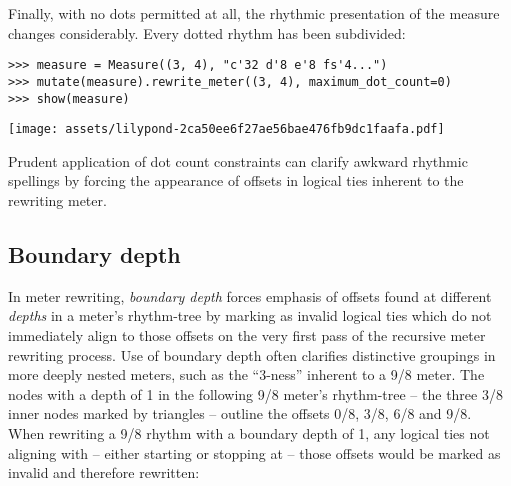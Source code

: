 \noindent Finally, with no dots permitted at all, the rhythmic presentation of
the measure changes considerably. Every dotted rhythm has been subdivided:

\begin{comment}
<abjad>
measure = Measure((3, 4), "c'32 d'8 e'8 fs'4...")
mutate(measure).rewrite_meter((3, 4), maximum_dot_count=0)
show(measure)
</abjad>
\end{comment}

\begin{abjadbookoutput}
\begin{singlespacing}
\vspace{-0.5\baselineskip}
\begin{lstlisting}
>>> measure = Measure((3, 4), "c'32 d'8 e'8 fs'4...")
>>> mutate(measure).rewrite_meter((3, 4), maximum_dot_count=0)
>>> show(measure)
\end{lstlisting}
\noindent\texttt{[image: assets/lilypond-2ca50ee6f27ae56bae476fb9dc1faafa.pdf]}
\end{singlespacing}
\end{abjadbookoutput}

\noindent Prudent application of dot count constraints can clarify awkward
rhythmic spellings by forcing the appearance of offsets in logical ties
inherent to the rewriting meter.

\subsection{Boundary depth} %

In meter rewriting, \emph{boundary depth} forces emphasis of offsets found at
different \emph{depths} in a meter's rhythm-tree by marking as invalid logical
ties which do not immediately align to those offsets on the very first pass of
the recursive meter rewriting process. Use of boundary depth often clarifies
distinctive groupings in more deeply nested meters, such as the
\enquote{3-ness} inherent to a 9/8 meter. The nodes with a depth of 1 in the
following 9/8 meter's rhythm-tree -- the three 3/8 inner nodes marked by
triangles -- outline the offsets 0/8, 3/8, 6/8 and 9/8. When rewriting a 9/8
rhythm with a boundary depth of 1, any logical ties not aligning with -- either
starting or stopping at -- those offsets would be marked as invalid and
therefore rewritten:

\begin{comment}
<abjad>
nine_eight_meter = metertools.Meter((9, 8))
graph(nine_eight_meter)
</abjad>
\end{comment}

